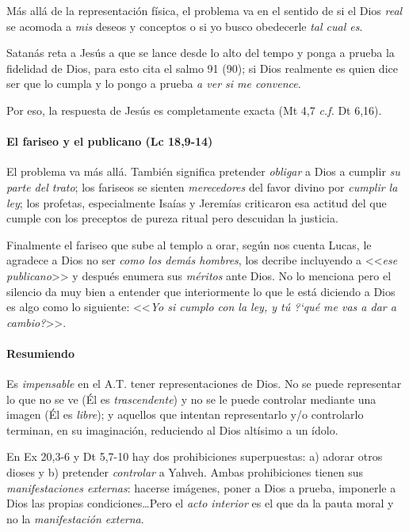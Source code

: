 \documentclass{article}
\begin{document}
M\'as all\'a de la representaci\'on f\'{i}sica, el problema va en el sentido de si el Dios \emph{real} se acomoda a \emph{mis} deseos y conceptos o si yo busco obedecerle \emph{tal cual es}.

Satan\'as reta a Jes\'us a que se lance desde lo alto del tempo y ponga a prueba la fidelidad de Dios, para esto cita el salmo 91 (90); si Dios realmente es quien dice ser que lo cumpla y lo pongo a prueba \emph{a ver si me convence}.

Por eso, la respuesta de Jes\'us es completamente exacta (Mt 4,7 \emph{c.f.} Dt 6,16).

\paragraph{El fariseo y el publicano (Lc 18,9-14)}

El problema va m\'as all\'a. Tambi\'en significa pretender \emph{obligar} a Dios a cumplir \emph{su parte del trato}; los fariseos se sienten \emph{merecedores} del favor divino por \emph{cumplir la ley}; los profetas, especialmente Isa\'{i}as y Jerem\'{i}as criticaron esa actitud del que cumple con los preceptos de pureza ritual pero descuidan la justicia.

Finalmente el fariseo que sube al templo a orar, seg\'un nos cuenta Lucas, le agradece a Dios no ser \emph{como los dem\'as hombres}, los decribe incluyendo a <<\emph{ese publicano}>> y despu\'es enumera sus \emph{m\'eritos} ante Dios. No lo menciona pero el silencio da muy bien a entender que interiormente lo que le est\'a diciendo a Dios es algo como lo siguiente: <<\emph{Yo si cumplo con la ley, y t\'u ?`qu\'e me vas a dar a cambio?}>>.

\paragraph{Resumiendo}

Es \emph{impensable} en el A.T. tener representaciones de Dios. No se puede representar lo que no se ve (\'El es \emph{trascendente}) y no se le puede controlar mediante una imagen (\'El es \emph{libre}); y aquellos que intentan representarlo y/o controlarlo terminan, en su imaginaci\'on, reduciendo al Dios alt\'{i}simo a un \'{i}dolo.

En Ex 20,3-6 y Dt 5,7-10 hay dos prohibiciones superpuestas: a) adorar otros dioses y b) pretender \emph{controlar} a Yahveh. Ambas prohibiciones tienen sus \emph{manifestaciones externas}: hacerse im\'agenes, poner a Dios a prueba, imponerle a Dios las propias condiciones\ldots Pero el \emph{acto interior} es el que da la pauta moral y no la \emph{manifestaci\'on externa}.
\end{document}
